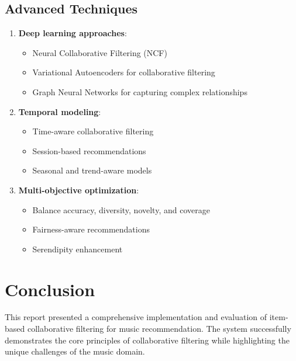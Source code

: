 \documentclass[12pt,a4paper]{article}
\begin{document}
\subsection{Advanced Techniques}
\begin{enumerate}
    \item \textbf{Deep learning approaches}:
        \begin{itemize}
            \item Neural Collaborative Filtering (NCF)
            \item Variational Autoencoders for collaborative filtering
            \item Graph Neural Networks for capturing complex relationships
        \end{itemize}
    
    \item \textbf{Temporal modeling}:
        \begin{itemize}
            \item Time-aware collaborative filtering
            \item Session-based recommendations
            \item Seasonal and trend-aware models
        \end{itemize}
    
    \item \textbf{Multi-objective optimization}:
        \begin{itemize}
            \item Balance accuracy, diversity, novelty, and coverage
            \item Fairness-aware recommendations
            \item Serendipity enhancement
        \end{itemize}
\end{enumerate}

\section{Conclusion}

This report presented a comprehensive implementation and evaluation of item-based collaborative filtering for music recommendation. The system successfully demonstrates the core principles of collaborative filtering while highlighting the unique challenges of the music domain.
\end{document}
